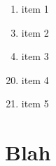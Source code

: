 \documentclass{article}
\begin{document}
 
\setcounter{secnumdepth}{0}

\begin{enumerate}
    \setcounter{enumi}{0}
    \item item 1
\end{enumerate}

\begin{enumerate}
    \setcounter{enumi}{2}
    \item item 2
    \item item 3
\end{enumerate}

\begin{enumerate}
    \setcounter{enumi}{19}
    \item item 4
    \item item 5
\end{enumerate}


\section{Blah}
\end{document}
